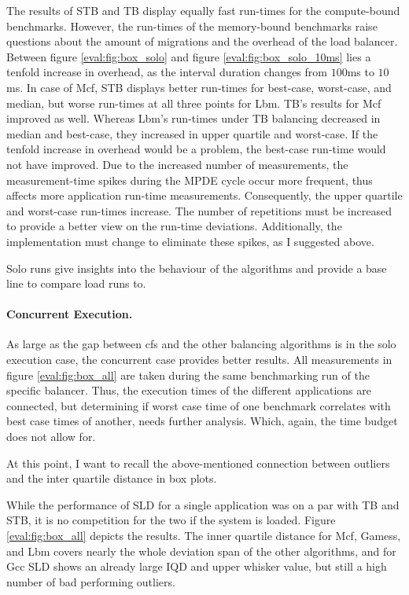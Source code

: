 The results of STB and TB display equally fast run-times for the compute-bound
benchmarks.
However, the run-times of the memory-bound benchmarks raise questions about the
amount of migrations and the overhead of the load balancer.
Between figure \ref{eval:fig:box_solo} and figure \ref{eval:fig:box_solo_10ms}
lies a tenfold increase in overhead, as the interval duration changes from
$100$ms to $10$ms.
In case of Mcf, STB displays better run-times for best-case, worst-case, and
median, but worse run-times at all three points for Lbm.
TB's results for Mcf improved as well.
Whereas Lbm's run-times under TB balancing decreased in median and best-case,
they increased in upper quartile and worst-case.
If the tenfold increase in overhead would be a problem, the best-case run-time
would not have improved.
Due to the increased number of measurements, the measurement-time spikes during
the MPDE cycle occur more frequent, thus affects more application run-time
measurements.
Consequently, the upper quartile and worst-case run-times increase.
The number of repetitions must be increased to provide a better view on the
run-time deviations.
Additionally, the implementation must change to eliminate these spikes, as I
suggested above.

Solo runs give insights into the behaviour of the algorithms and provide
a base line to compare load runs to.


\paragraph{Concurrent Execution.}
As large as the gap between \gls{cfs} and the other balancing algorithms is in
the solo execution case, the concurrent case provides better results.
All measurements in figure \ref{eval:fig:box_all} are taken during the same
benchmarking run of the specific balancer.
Thus, the execution times of the different applications are connected, but
determining if worst case time of one benchmark correlates with best case times
of another, needs further analysis.
Which, again, the time budget does not allow for.

At this point, I want to recall the above-mentioned connection between outliers
and the inter quartile distance in box plots.

While the performance of SLD for a single application was on a par with TB and
STB, it is no competition for the two if the system is loaded.
Figure \ref{eval:fig:box_all} depicts the results.
The inner quartile distance for Mcf, Gamess, and Lbm covers nearly the whole
deviation span of the other algorithms, and for Gcc SLD shows an already large
IQD and upper whisker value, but still a high number of bad performing outliers.

